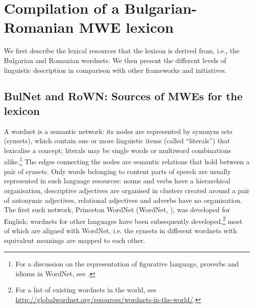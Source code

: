 \documentclass[output=paper,colorlinks,citecolor=brown]{langscibook}
\begin{document}



\section{Compilation of a Bulgarian-Romanian MWE lexicon} \label{sec:compilation}

We first describe the lexical resources that the lexicon is derived from, i.e., the Bulgarian and Romanian wordnets. We then present the different levels of linguistic description in comparison with other frameworks and initiatives.%

\subsection{BulNet and RoWN: Sources of MWEs for the lexicon} \label{sec:wordnets}

A wordnet is a semantic network: its nodes are represented by synonym sets (synsets), which contain one or more linguistic items (called ``literals'') that lexicalise a concept; literals may be single words or multiword %
combinations alike.\footnote{For a discussion on the representation of figurative language, proverbs and idioms in WordNet, see \citet{fellbaum-1998-towards}.} The edges connecting the nodes are semantic relations that hold between a pair of synsets. Only words belonging to content parts of speech are usually represented in such language resources: nouns and verbs have a hierarchical organisation, descriptive adjectives are organised in clusters created around a pair of antonymic adjectives, relational adjectives and adverbs have no organisation.
The first such network, Princeton WordNet (WordNet, \citealt{miller}), was developed for English; wordnets for other languages have been subsequently developed,\footnote{For a list of existing wordnets in the world, see \url{http://globalwordnet.org/resources/wordnets-in-the-world/}.} most of which are aligned with WordNet, i.e. the synsets in different wordnets with equivalent meanings are mapped to each other.
\end{document}
